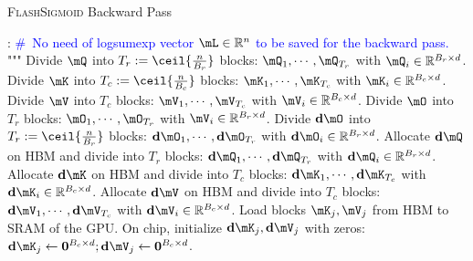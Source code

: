 \begin{algorithm}[!h]
    \caption{\textsc{FlashSigmoid} Backward Pass}
    \label{alg:FlashSigmoidBackward}
    \begin{algorithmic}[1]
    :
        \State {\textcolor{gray}{"""}}
        \State \qquad{} {\textcolor{blue}{\#\ No need of logsumexp vector $\mL\in\mathbb{R}^n$ to be saved for the backward pass.}}
        \State
        \State """
        \State Divide $\mQ$ into $T_r := \ceil{\frac{n}{B_r}}$ blocks: $\mQ_1, \cdots, \mQ_{T_r}$ with $\mQ_i\in\mathbb{R}^{B_r\times d}$. 
        \State Divide $\mK$ into $T_c := \ceil{\frac{n}{B_c}}$ blocks: $\mK_1, \cdots, \mK_{T_c}$ with $\mK_i\in\mathbb{R}^{B_c\times d}$. 
        \State Divide $\mV$ into $T_c$ blocks: $\mV_1, \cdots, \mV_{T_c}$ with $\mV_i\in\mathbb{R}^{B_c\times d}$. 
        \State Divide $\mO$ into $T_r$ blocks: $\mO_1, \cdots, \mO_{T_r}$ with $\mV_i\in\mathbb{R}^{B_r\times d}$. 
        \State Divide $\mathbf{d}\mO$ into $T_r := \ceil{\frac{n}{B_r}}$ blocks: $\mathbf{d}\mO_1, \cdots, \mathbf{d}\mO_{T_r}$ with $\mathbf{d}\mO_i\in\mathbb{R}^{B_r\times d}$. 
        \State Allocate $\mathbf{d}\mQ$ on HBM and divide into $T_r$ blocks: $\mathbf{d}\mQ_1, \cdots, \mathbf{d}\mQ_{T_r}$ with $\mathbf{d}\mQ_i\in\mathbb{R}^{B_r\times d}$. 
        \State Allocate $\mathbf{d}\mK$ on HBM and divide into $T_c$ blocks: $\mathbf{d}\mK_1, \cdots, \mathbf{d}\mK_{T_c}$ with $\mathbf{d}\mK_i\in\mathbb{R}^{B_c\times d}$. 
        \State Allocate $\mathbf{d}\mV$ on HBM and divide into $T_c$ blocks: $\mathbf{d}\mV_1, \cdots, \mathbf{d}\mV_{T_c}$ with $\mathbf{d}\mV_i\in\mathbb{R}^{B_c\times d}$. 
            \State Load blocks $\mK_j, \mV_j$ from HBM to SRAM of the GPU.
            \State On chip, initialize $\mathbf{d}\mK_j, \mathbf{d}\mV_j$ with zeros: $\mathbf{d}\mK_j \leftarrow \mathbf{0}^{B_c\times d}; \mathbf{d}\mV_j \leftarrow \mathbf{0}^{B_c\times d}$.

\end{algorithmic}
\end{algorithm}
